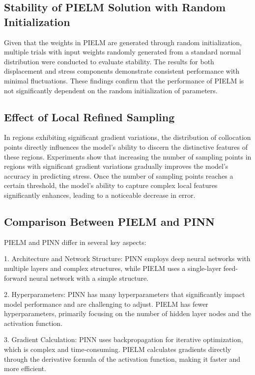 \documentclass[11pt]{article}
\begin{document}
\subsection{Stability of PIELM Solution with Random Initialization}

Given that the weights in PIELM are generated through random initialization, multiple trials with input weights randomly generated from a standard normal distribution were conducted to evaluate stability. The results for both displacement and stress components demonstrate consistent performance with minimal fluctuations. These findings confirm that the performance of PIELM is not significantly dependent on the random initialization of parameters.

\subsection{Effect of Local Refined Sampling}

In regions exhibiting significant gradient variations, the distribution of collocation points directly influences the model's ability to discern the distinctive features of these regions. Experiments show that increasing the number of sampling points in regions with significant gradient variations gradually improves the model's accuracy in predicting stress. Once the number of sampling points reaches a certain threshold, the model's ability to capture complex local features significantly enhances, leading to a noticeable decrease in error.

\subsection{Comparison Between PIELM and PINN}

PIELM and PINN differ in several key aspects:

1. Architecture and Network Structure: PINN employs deep neural networks with multiple layers and complex structures, while PIELM uses a single-layer feed-forward neural network with a simple structure.

2. Hyperparameters: PINN has many hyperparameters that significantly impact model performance and are challenging to adjust. PIELM has fewer hyperparameters, primarily focusing on the number of hidden layer nodes and the activation function.

3. Gradient Calculation: PINN uses backpropagation for iterative optimization, which is complex and time-consuming. PIELM calculates gradients directly through the derivative formula of the activation function, making it faster and more efficient.
\end{document}
